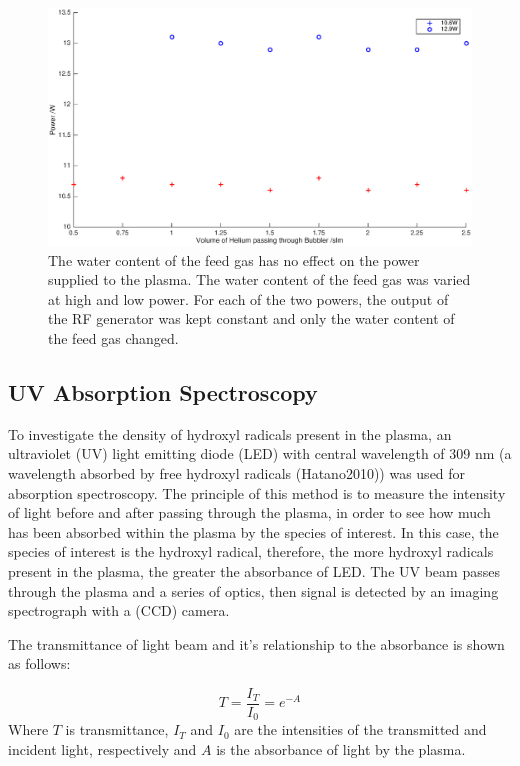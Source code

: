 \documentclass[11pt, oneside]{article}   	%
\begin{document}
\begin{figure}
    \centering
    \includegraphics[width=\textwidth]{Figures/BubblerPower.eps}
    \caption{The water content of the feed gas has no effect on the power supplied to the plasma. The water content of the feed gas was varied at high and low power. For each of the two powers, the output of the RF generator was kept constant and only the water content of the feed gas changed.}
    \label{fig:BubblerPower}
\end{figure}

\subsection{UV Absorption Spectroscopy}
To investigate the density of hydroxyl radicals present in the plasma, an ultraviolet (UV) light emitting diode (LED) with central wavelength of 309 nm (a wavelength absorbed by free hydroxyl radicals (Hatano2010)) was used for absorption spectroscopy.
The principle of this method is to measure the intensity of light before and after passing through the plasma, in order to see how much has been absorbed within the plasma by the species of interest.
In this case, the species of interest is the hydroxyl radical, therefore, the more hydroxyl radicals present in the plasma, the greater the absorbance of LED.
The UV beam passes through the plasma and a series of optics, then signal is detected by an imaging spectrograph with a (CCD) camera.

The transmittance of light beam and it's relationship to the absorbance is shown as follows:


\begin{equation} \label{eqn:Transmittance}
    T = \frac{I_T}{I_0} = e^{-A}
\end{equation}
Where $T$ is transmittance, $I_T$ and $I_0$ are the intensities of the transmitted and incident light, respectively and $A$ is the absorbance of light by the plasma.
\end{document}

